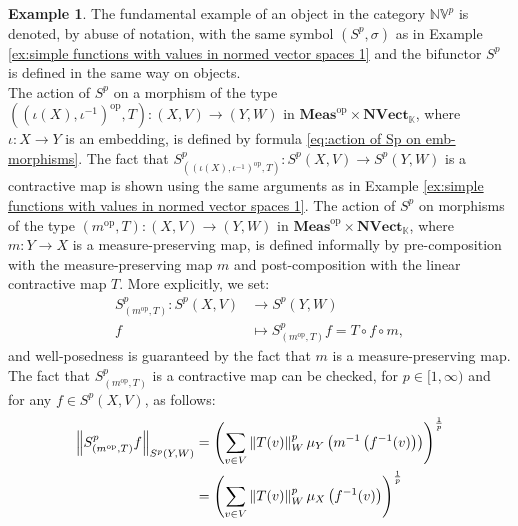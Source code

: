 \documentclass{amsart}
\theoremstyle{definition}
\newtheorem{example}[definition]{Example}
\theoremstyle{plain}
\newcommand{\norm}[1]{\left\lVert #1\right\rVert} %
\newcommand{\opMeas}{\mathbf{Meas}^\mathrm{op}}
\newcommand{\NVect}{\mathbf{NVect}_{\mathbb{K}}}
\newcommand{\NVp}{\mathbb{NV}^p}
\begin{document}
        \begin{example}
        \label{ex:simple functions with values in normed vector spaces 2}
            The fundamental example of an object in the category $\NVp$ is denoted, by abuse of notation, with the same symbol $(S^p,\sigma)$ as in Example \ref{ex:simple functions with values in normed vector spaces 1} and the bifunctor $S^p$ is defined in the same way on objects. \\ 
            The action of $S^p$ on a morphism of the type $\left( \left( \iota(X),\iota^{-1} \right)^{\mathrm{op}},T \right) \colon (X,V) \rightarrow (Y,W)$ in $\opMeas \times \NVect$, where $\iota \colon X \rightarrow Y$ is an embedding, is defined by formula \eqref{eq:action of Sp on emb-morphisms}.
            The fact that $S^p_{\left( \left( \iota(X),\iota^{-1} \right)^{\mathrm{op}},T \right)} \colon S^p(X,V) \rightarrow S^p(Y,W)$ is a contractive map is shown using the same arguments as in Example \ref{ex:simple functions with values in normed vector spaces 1}.
            The action of $S^p$ on morphisms of the type $\left( m^{\mathrm{op}},T \right) \colon (X,V) \rightarrow (Y,W)$ in $\opMeas \times \NVect$, where $m \colon Y \rightarrow X$ is a measure-preserving map, is defined informally by pre-composition with the measure-preserving map $m$ and post-composition with the linear contractive map $T$. 
            More explicitly, we set:
            \begin{equation}
            \label{eq:action of Sp on measure-preserving maps}
                \begin{split}
                    S^p_{\left( m^{\mathrm{op}},T \right)} \colon S^p(X,V) &\rightarrow S^p(Y,W) \\
                    f &\mapsto S^p_{\left( m^{\mathrm{op}},T \right)}f = T \circ f \circ m,
                \end{split}
            \end{equation}
            and well-posedness is guaranteed by the fact that $m$ is a measure-preserving map. 
            The fact that $S^p_{\left( m^{\mathrm{op}},T \right)}$ is a contractive map can be checked, for $p \in [1,\infty)$ and for any $f \in S^p(X,V)$, as follows:
            \begin{align}
                \norm{S^p_{\left( m^{\mathrm{op}},T \right)}f}_{S^p(Y,W)} &= \left( \sum_{v \in V} \norm{T(v)}_W^p \mu_Y\left( m^{-1}\left( f^{-1}(v) \right) \right) \right)^{\frac{1}{p}} \notag \\
                &= \left( \sum_{v \in V} \norm{T(v)}_W^p \mu_X\left( f^{-1}(v) \right) \right)^{\frac{1}{p}} \label{eq:using that m is a measure-preserving map} \\

\end{align}
\end{example}
\end{document}
